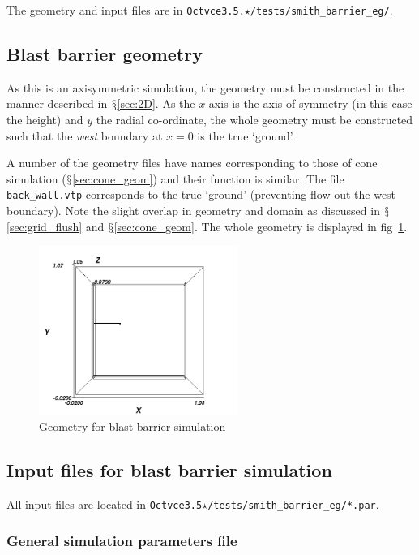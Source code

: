 \documentclass[pdftex, 12pt, a4paper]{report}
\begin{document}
The geometry and input files are in \verb'Octvce3.5.'$\star$\verb'/tests/smith_barrier_eg/'.

\subsection{Blast barrier geometry}\label{sec:smith_geom}

As this is an axisymmetric simulation, the geometry must be constructed in the manner described in $\mathsection$\ref{sec:2D}.
As the $x$ axis is the axis of symmetry (in this case the height) and $y$ the radial co-ordinate, the whole geometry must be 
constructed such that the \emph{west} boundary at $x = 0$ is the true `ground'.

A number of the geometry files have names corresponding to those of cone simulation ($\mathsection$\ref{sec:cone_geom}) and their
function is similar.  The file \verb'back_wall.vtp' corresponds to the true `ground' (preventing flow out the west boundary).
Note the slight overlap in geometry and domain as discussed in $\mathsection$\ref{sec:grid_flush} and $\mathsection$\ref{sec:cone_geom}.
The whole geometry is displayed in fig~\ref{fig:smith_geomfig}.

\begin{figure}[htp]
\centering
\includegraphics[width=6.5cm]{pics/smith_barrier_eg/sgeom.jpg}
\caption{Geometry for blast barrier simulation}
\label{fig:smith_geomfig}
\end{figure}

\subsection{Input files for blast barrier simulation}\label{sec:smith_par}

All input files are located in \verb'Octvce3.5'$\star$\verb'/tests/smith_barrier_eg/*.par'.

\subsubsection{General simulation parameters file}
\end{document}
